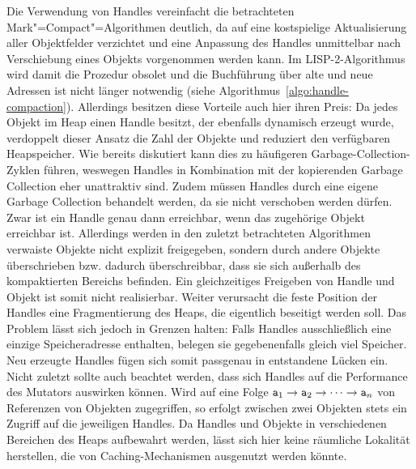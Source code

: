 Die Verwendung von Handles vereinfacht die betrachteten Mark"=Compact"=Algorithmen deutlich, da auf eine kostspielige Aktualisierung aller Objektfelder verzichtet und eine Anpassung des Handles unmittelbar nach Verschiebung eines Objekts vorgenommen werden kann.
Im LISP-2-Algorithmus wird damit die Prozedur  obsolet und die Buchführung über alte und neue Adressen ist nicht länger notwendig (siehe Algorithmus~\ref{algo:handle-compaction}).
Allerdings besitzen diese Vorteile auch hier ihren Preis:
Da jedes Objekt im Heap einen Handle besitzt, der ebenfalls dynamisch erzeugt wurde, verdoppelt dieser Ansatz die Zahl der Objekte und reduziert den verfügbaren Heapspeicher.
Wie bereits diskutiert kann dies zu häufigeren Garbage-Collection-Zyklen führen, weswegen Handles in Kombination mit der kopierenden Garbage Collection eher unattraktiv sind.
Zudem müssen Handles durch eine eigene Garbage Collection behandelt werden, da sie nicht verschoben werden dürfen.
Zwar ist ein Handle genau dann erreichbar, wenn das zugehörige Objekt erreichbar ist.
Allerdings werden in den zuletzt betrachteten Algorithmen verwaiste Objekte nicht explizit freigegeben, sondern durch andere Objekte überschrieben bzw. dadurch überschreibbar, dass sie sich außerhalb des kompaktierten Bereichs befinden.
Ein gleichzeitiges Freigeben von Handle und Objekt ist somit nicht realisierbar.
Weiter verursacht die feste Position der Handles eine Fragmentierung des Heaps, die eigentlich beseitigt werden soll.
Das Problem lässt sich jedoch in Grenzen halten:
Falls Handles ausschließlich eine einzige Speicheradresse enthalten, belegen sie gegebenenfalls gleich viel Speicher.
Neu erzeugte Handles fügen sich somit passgenau in entstandene Lücken ein.
Nicht zuletzt sollte auch beachtet werden, dass sich Handles auf die Performance des Mutators auswirken können.
Wird auf eine Folge $\texttt{a}_1 \rightarrow \texttt{a}_2 \rightarrow \dots \rightarrow \texttt{a}_n$ von Referenzen von Objekten zugegriffen, so erfolgt zwischen zwei Objekten stets ein Zugriff auf die jeweiligen Handles.
Da Handles und Objekte in verschiedenen Bereichen des Heaps aufbewahrt werden, lässt sich hier keine räumliche Lokalität herstellen, die von Caching-Mechanismen ausgenutzt werden könnte.

